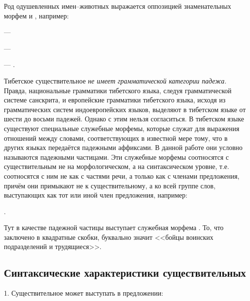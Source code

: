 Род одушевленных имен--животных выражается оппозицией знаменательных морфем  и , например:
\begin{prfsample}
    \item {} --- 
    \item {} --- 
    \item {} --- .
\end{prfsample}

\label{page71}Тибетское существительное \emph{не имеет грамматической категории падежа}. Правда, национальные грамматики тибетского языка, следуя грамматической системе санскрита, и европейские грамматики тибетского языка, исходя из грамматических систем индоевропейских языков, выделяют в тибетском языке от шести до восьми падежей. Однако с этим нельзя согласиться. В тибетском языке существуют специальные служебные морфемы, которые служат для выражения отношений между словами, соответствующих в известной мере тому, что в других языках передаётся падежными аффиксами. В данной работе они условно называются падежными частицами. Эти служебные морфемы соотносятся с существительным не на морфологическом, а на синтаксическом уровне, т.е. соотносятся с ним не как с частями речи, а только как с членами предложения, причём они примыкают не к существительному, а ко всей группе слов, выступающих как тот или иной член предложения, например:
\begin{prfsample}
    \item {}.
\end{prfsample}
Тут в качестве падежной частицы выступает служебная морфема . То, что заключено в квадратные скобки, буквально значит <<бойцы воинских подразделений и трудящиеся>>.

\subsection{Синтаксические характеристики существительных}

1. Существительное может выступать в предложении:

